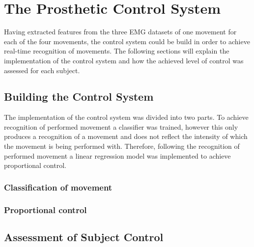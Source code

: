 
\section{The Prosthetic Control System}

Having extracted features from the three EMG datasets of one movement for each of the four movements, the control system could be build in order to achieve real-time recognition of movements. The following sections will explain the implementation of the control system and how the achieved level of control was assessed for each subject. 

\subsection{Building the Control System} 

The implementation of the control system was divided into two parts. To achieve recognition of performed movement a classifier was trained, however this only produces a recognition of a movement and does not reflect the intensity of which the movement is being performed with. Therefore, following the recognition of performed movement a linear regression model was implemented to achieve proportional control. 

\subsubsection{Classification of movement}


\subsubsection{Proportional control}  



\subsection{Assessment of Subject Control}
